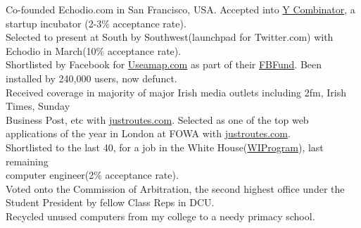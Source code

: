 \documentclass[margin,line]{resume}
\begin{document}
\begin{resume}
    Co-founded Echodio.com in San Francisco, USA. Accepted into \href{http://ycombinator.com/}{Y Combinator}, a startup incubator (2-3\% acceptance rate).\vspace{1mm}\\%
    Selected to present at South by Southwest(launchpad for Twitter.com) with Echodio in March(10\% acceptance rate).\vspace{1mm}\\%
    Shortlisted by Facebook for \href{http://useamap.}{Useamap.com} as part of their \href{http://fbfund.com/about/}{FBFund}. Been installed by 240,000 users, now defunct.\vspace{1mm}\\%
    Received coverage in majority of major Irish media outlets including 2fm, Irish Times, Sunday \\ Business Post, etc with \href{http://justroutes.com}{justroutes.com}. Selected as one of the top web applications of the year in London at FOWA with \href{http://justroutes.com}{justroutes.com}.\vspace{1mm}\\%
    Shortlisted to the last 40, for a job in the White House(\href{http://wiprogram.org/WIP}{WIProgram}), last remaining \\ computer engineer(2\% acceptance rate).\vspace{1mm}\\%
    Voted onto the Commission of Arbitration, the second highest office under the Student President by fellow Class Reps in DCU.\vspace{1mm}\\%
    Recycled unused computers from my college to a needy primacy school.\vspace{1mm}\\%



\end{resume}
\end{document}
